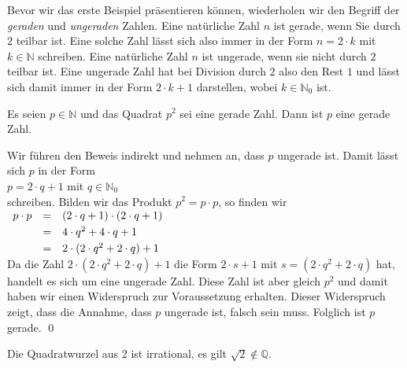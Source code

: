 Bevor wir das erste Beispiel pr\"{a}sentieren k\"{o}nnen, wiederholen wir den Begriff der \emph{geraden} und
\emph{ungeraden} Zahlen.  Eine nat\"{u}rliche Zahl $n$ ist gerade, wenn Sie durch $2$ teilbar ist.  Eine
solche Zahl l\"{a}sst sich also immer in der Form $n = 2 \cdot k$ mit $k \in \mathbb{N}$ schreiben.
Eine nat\"{u}rliche Zahl $n$  ist ungerade, wenn sie nicht durch $2$ teilbar ist.  Eine ungerade Zahl
hat bei Division durch $2$ also den Rest $1$ und l\"{a}sst sich damit immer in der Form $2 \cdot k + 1$
darstellen, wobei $k \in \mathbb{N}_0$ ist.

\begin{Lemma} \label{lemma:b1}
  Es seien $p \in \mathbb{N}$ und das Quadrat $p^2$ sei eine gerade Zahl.
  Dann ist $p$ eine gerade Zahl.
\end{Lemma}

\proof
Wir f\"{u}hren den Beweis indirekt und nehmen an, dass $p$ ungerade ist.  Damit l\"{a}sst sich $p$  in der Form
\\[0.2cm]
\hspace*{1.3cm}
$p = 2 \cdot q + 1$ \quad mit \quad $q \in \mathbb{N}_0$
\\[0.2cm]
schreiben.  Bilden wir das Produkt $p^2 = p \cdot p$, so finden wir
\\[0.2cm]
\hspace*{1.3cm}
$
\begin{array}[t]{rcl}
  p \cdot p & = & (2 \cdot q + 1) \cdot (2 \cdot q + 1) \\[0.1cm]
            & = & 4 \cdot q^2 + 4 \cdot q + 1           \\[0.1cm]
            & = & 2 \cdot (2 \cdot q^2 + 2 \cdot q) + 1 
\end{array}
$
\\[0.2cm]
Da die Zahl $2 \cdot (2 \cdot q^2 + 2 \cdot q) + 1$ die Form $2 \cdot s + 1$ mit
$s = (2 \cdot q^2 + 2 \cdot q)$ hat, handelt es sich um eine ungerade Zahl.
Diese Zahl ist aber gleich $p^2$ und damit haben wir einen Widerspruch zur
Voraussetzung erhalten.  Dieser Widerspruch zeigt, dass die Annahme, dass $p$ ungerade ist, falsch
sein muss.  Folglich ist $p$ gerade.
\qed

\begin{Satz}
  Die Quadratwurzel aus 2 ist irrational, es gilt $\sqrt{2} \not\in \mathbb{Q}$.
\end{Satz}

